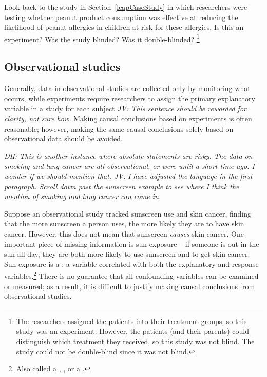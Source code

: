 \begin{doublespace}
\begin{exercise}
	Look back to the study in Section~\ref{leapCaseStudy} in which researchers were testing whether peanut product consumption was effective at reducing the likelihood of peanut allergies in children at-risk for these allergies. Is this an experiment? Was the study blinded? Was it double-blinded? \footnote{The researchers assigned the patients into their treatment groups, so this study was an experiment. However, the patients (and their parents) could distinguish which treatment they received, so this study was not blind. The study could not be double-blind since it was not blind.}
\end{exercise}

\subsection{Observational studies}

Generally, data in observational studies are collected only by monitoring what occurs, while experiments require researchers to assign the primary explanatory variable in a study for each subject \textit{JV: This sentence should be reworded for clarity, not sure how.} Making causal conclusions based on experiments is often reasonable; however, making the same causal conclusions solely based on observational data should be avoided. 

\textit{DH: This is another instance where absolute statements are risky.  The data on smoking and lung cancer are all observational, or were until a short time ago.  I wonder if we should mention that. JV: I have adjusted the language in the first paragraph. Scroll down past the sunscreen example to see where I think the mention of smoking and lung cancer can come in.}

Suppose an observational study tracked sunscreen use and skin cancer, finding that the more sunscreen a person uses, the more likely they are to have skin cancer. However, this does not mean that sunscreen \emph{causes} skin cancer. One important piece of missing information is sun exposure -- if someone is out in the sun all day, they are both more likely to use sunscreen and to get skin cancer. Sun exposure is a  : a variable correlated with both the explanatory and response variables.\footnote{Also called a , , or a .} There is no guarantee that all confounding variables can be examined or measured; as a result, it is difficult to justify making causal conclusions from observational studies. 


\end{doublespace}
